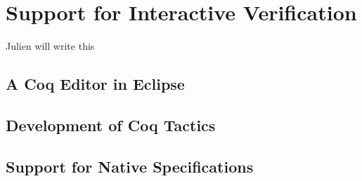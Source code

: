 \section{Support for Interactive Verification}\label{SecInteractive}

Julien will write this
\subsection{A Coq Editor in Eclipse}

\subsection{Development of Coq Tactics}

\subsection{Support for Native Specifications}



